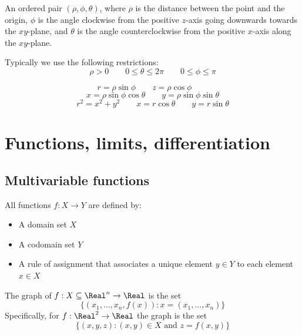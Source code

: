 \begin{definition}
  An ordered pair $(\rho, \phi, \theta)$, where $\rho$ is the distance between the point and the origin, $\phi$ is the angle clockwise from the positive $z$-axis going downwards towards the $xy$-plane, and $\theta$ is the angle counterclockwise from the positive $x$-axis along the $xy$-plane.

  Typically we use the following restrictions:
  \[
    \rho > 0 \qquad 0 \leq \theta \leq 2\pi \qquad 0 \leq \phi \leq \pi
  \]
\end{definition}

\begin{theorem}
  \[
    r = \rho \sin \phi \qquad z = \rho \cos \phi \qquad
  \]\[
    x = \rho \sin \phi \cos \theta \qquad y = \rho \sin \phi \sin \theta
  \]\[
    r^2 = x^2 + y^2 \qquad x = r \cos \theta \qquad y = r \sin \theta
  \]
\end{theorem}

\section{Functions, limits, differentiation}

\subsection{Multivariable functions}


\begin{definition}[Function]
  All functions $f : X \to Y$ are defined by:
  \begin{itemize}
    \item A domain set $X$
    \item A codomain set $Y$
    \item A rule of assignment that associates a unique element $y \in Y$ to each element $x \in X$
  \end{itemize}
\end{definition}

\begin{definition}[Graph]
  The graph of $f : X \subseteq \Real^n \to \Real$ is the set
  \[
    \{(x_1, \ldots, x_n, f(x)) : x = (x_1, \ldots, x_n)\}
  \]
  Specifically, for $f : \Real^2 \to \Real$ the graph is the set
  \[
    \{(x, y, z) : (x, y) \in X \text{ and } z = f(x, y)\}
  \]
\end{definition}

